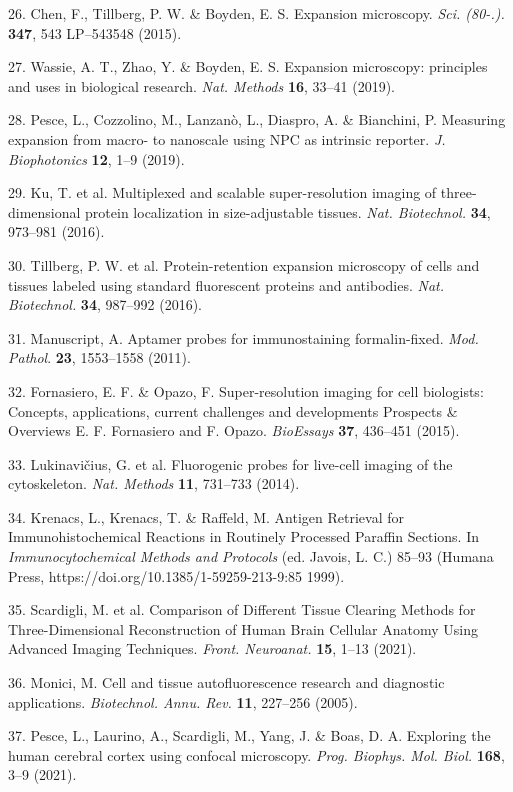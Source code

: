 \documentclass{article}
\begin{document}
\begin{hangpars}
26. Chen, F., Tillberg, P. W. \& Boyden, E. S. Expansion microscopy. \emph{Sci. (80-.).} \textbf{347}, 543 LP–543548 (2015).

27. Wassie, A. T., Zhao, Y. \& Boyden, E. S. Expansion microscopy: principles and uses in biological research. \emph{Nat. Methods} \textbf{16}, 33–41 (2019).

28. Pesce, L., Cozzolino, M., Lanzanò, L., Diaspro, A. \& Bianchini, P. Measuring expansion from macro- to nanoscale using NPC as intrinsic reporter. \emph{J. Biophotonics} \textbf{12}, 1–9 (2019).

29. Ku, T. et al. Multiplexed and scalable super-resolution imaging of three-dimensional protein localization in size-adjustable tissues. \emph{Nat. Biotechnol.} \textbf{34}, 973–981 (2016).

30. Tillberg, P. W. et al. Protein-retention expansion microscopy of cells and tissues labeled using standard fluorescent proteins and antibodies. \emph{Nat. Biotechnol.} \textbf{34}, 987–992 (2016).

31. Manuscript, A. Aptamer probes for immunostaining formalin-fixed. \emph{Mod. Pathol}. \textbf{23}, 1553–1558 (2011).

32. Fornasiero, E. F. \& Opazo, F. Super-resolution imaging for cell biologists: Concepts, applications, current challenges and developments Prospects \& Overviews E. F. Fornasiero and F. Opazo. \emph{BioEssays} \textbf{37}, 436–451 (2015).

33. Lukinavičius, G. et al. Fluorogenic probes for live-cell imaging of the cytoskeleton. \emph{Nat. Methods} \textbf{11}, 731–733 (2014).

34. Krenacs, L., Krenacs, T. \& Raffeld, M. Antigen Retrieval for Immunohistochemical Reactions in Routinely Processed Paraffin Sections. In \emph{Immunocytochemical Methods and Protocols} (ed. Javois, L. C.) 85–93 (Humana Press, https://doi.org/10.1385/1-59259-213-9:85 1999).

35. Scardigli, M. et al. Comparison of Different Tissue Clearing Methods for Three-Dimensional Reconstruction of Human Brain Cellular Anatomy Using Advanced Imaging Techniques. \emph{Front. Neuroanat.} \textbf{15}, 1–13 (2021).

36. Monici, M. Cell and tissue autofluorescence research and diagnostic applications. \emph{Biotechnol. Annu. Rev.} \textbf{11}, 227–256 (2005).

37. Pesce, L., Laurino, A., Scardigli, M., Yang, J. \& Boas, D. A. Exploring the human cerebral cortex using confocal microscopy. \emph{Prog. Biophys. Mol. Biol.} \textbf{168}, 3–9 (2021).


\end{hangpars}
\end{document}
